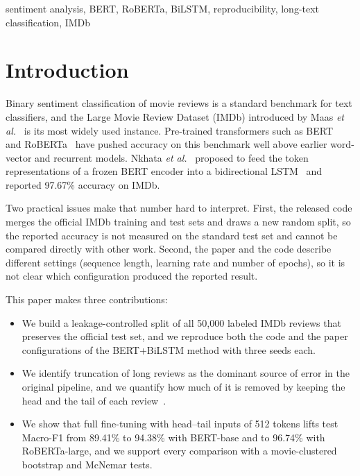 \documentclass[conference]{IEEEtran}
\begin{document}
\begin{IEEEkeywords}
sentiment analysis, BERT, RoBERTa, BiLSTM, reproducibility, long-text classification, IMDb
\end{IEEEkeywords}

\section{Introduction}
Binary sentiment classification of movie reviews is a standard benchmark for text classifiers, and the Large Movie Review Dataset (IMDb) introduced by Maas \textit{et al.}~\cite{maas2011} is its most widely used instance. Pre-trained transformers such as BERT~\cite{devlin2019} and RoBERTa~\cite{liu2019roberta} have pushed accuracy on this benchmark well above earlier word-vector and recurrent models. Nkhata \textit{et al.}~\cite{nkhata2023} proposed to feed the token representations of a frozen BERT encoder into a bidirectional LSTM~\cite{hochreiter1997,schuster1997} and reported 97.67\% accuracy on IMDb.

Two practical issues make that number hard to interpret. First, the released code merges the official IMDb training and test sets and draws a new random split, so the reported accuracy is not measured on the standard test set and cannot be compared directly with other work. Second, the paper and the code describe different settings (sequence length, learning rate and number of epochs), so it is not clear which configuration produced the reported result.

This paper makes three contributions:
\begin{itemize}
\item We build a leakage-controlled split of all 50{,}000 labeled IMDb reviews that preserves the official test set, and we reproduce both the code and the paper configurations of the BERT+BiLSTM method with three seeds each.
\item We identify truncation of long reviews as the dominant source of error in the original pipeline, and we quantify how much of it is removed by keeping the head and the tail of each review~\cite{sun2019}.
\item We show that full fine-tuning with head--tail inputs of 512 tokens lifts test Macro-F1 from 89.41\% to 94.38\% with BERT-base and to 96.74\% with RoBERTa-large, and we support every comparison with a movie-clustered bootstrap and McNemar tests.
\end{itemize}
\end{document}
